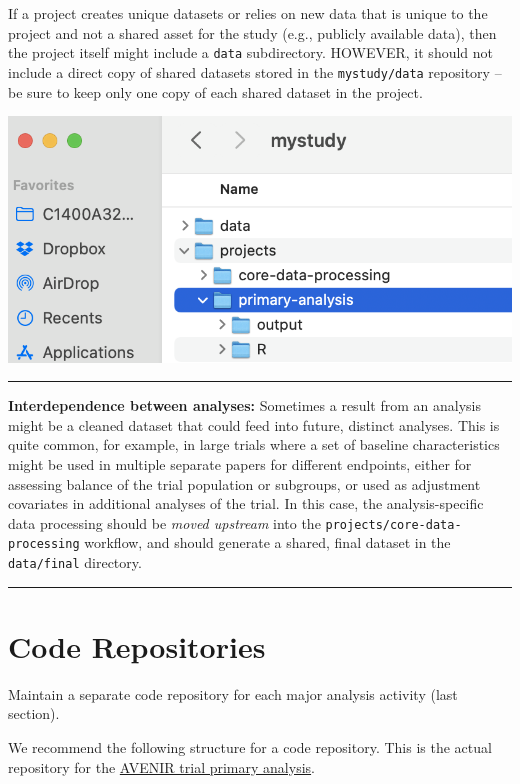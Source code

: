 \documentclass[
]{book}
\begin{document}
If a project creates unique datasets or relies on new data that is unique to the project and not a shared asset for the study (e.g., publicly available data), then the project itself might include a \texttt{data} subdirectory. HOWEVER, it should not include a direct copy of shared datasets stored in the \texttt{mystudy/data} repository -- be sure to keep only one copy of each shared dataset in the project.

\includegraphics[width=0.75\linewidth]{images/mystudy-dir-fig4}

\begin{center}\rule{0.5\linewidth}{0.5pt}\end{center}

\textbf{Interdependence between analyses:} Sometimes a result from an analysis might be a cleaned dataset that could feed into future, distinct analyses. This is quite common, for example, in large trials where a set of baseline characteristics might be used in multiple separate papers for different endpoints, either for assessing balance of the trial population or subgroups, or used as adjustment covariates in additional analyses of the trial. In this case, the analysis-specific data processing should be \emph{moved upstream} into the \texttt{projects/core-data-processing} workflow, and should generate a shared, final dataset in the \texttt{data/final} directory.

\begin{center}\rule{0.5\linewidth}{0.5pt}\end{center}

\section{Code Repositories}\label{code-repositories}

Maintain a separate code repository for each major analysis activity (last section).

We recommend the following structure for a code repository. This is the actual repository for the \href{https://github.com/proctor-ucsf/AVENIR-primary}{AVENIR trial primary analysis}.
\end{document}
